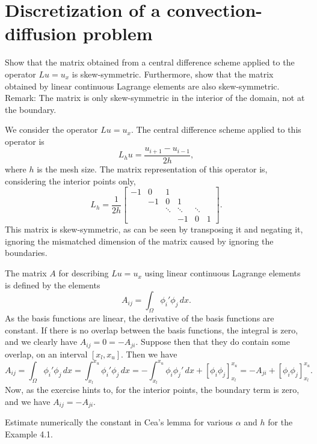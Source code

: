 \section{Discretization of a convection-diffusion problem}

\begin{exercise}
    Show that the matrix obtained from a central difference scheme applied to the operator $L u = u_x$ is skew-symmetric.
    Furthermore, show that the matrix obtained by linear continuous Lagrange elements are also skew-symmetric.
    Remark: The matrix is only skew-symmetric in the interior of the domain, not at the boundary.
\end{exercise}

\begin{solution}
    We consider the operator $L u = u_x$.
    The central difference scheme applied to this operator is
    \begin{equation*}
        L_h u = \frac{u_{i+1} - u_{i-1}}{2h},
    \end{equation*}
    where $h$ is the mesh size.
    The matrix representation of this operator is, considering the interior points only,
    \begin{equation*}
        L_h = \frac{1}{2h}
        \begin{bmatrix}
            -1 & 0 & 1 \\
            & -1 & 0 & 1 \\
            && \ddots & \ddots & \ddots \\
            &&& -1 & 0 & 1
        \end{bmatrix}.
    \end{equation*}
    This matrix is skew-symmetric, as can be seen by transposing it and negating it, ignoring the mismatched dimension of the matrix caused by ignoring the boundaries.

    The matrix $A$ for describing $L u = u_x$ using linear continuous Lagrange elements is defined by the elements
    \begin{equation*}
        A_{ij} = \int_{\Omega} \phi_i' \phi_j \, dx.
    \end{equation*}
    As the basis functions are linear, the derivative of the basis functions are constant.
    If there is no overlap between the basis functions, the integral is zero, and we clearly have $A_{ij} = 0 = -A_{ji}$.
    Suppose then that they do contain some overlap, on an interval $[x_l, x_u]$.
    Then we have
    \begin{equation*}
        A_{ij} = \int_{\Omega} \phi_i' \phi_j \, dx = \int_{x_l}^{x_u} \phi_i' \phi_j \, dx = -\int_{x_l}^{x_u} \phi_i \phi_j' \, dx + \left[ \phi_i \phi_j \right]_{x_l}^{x_u} = -A_{ji} + \left[ \phi_i \phi_j \right]_{x_l}^{x_u}.
    \end{equation*}
    Now, as the exercise hints to, for the interior points, the boundary term is zero, and we have $A_{ij} = -A_{ji}$.
\end{solution}

\begin{exercise}
    Estimate numerically the constant in Cea’s lemma for various $\alpha$ and $h$ for the Example 4.1.
\end{exercise}